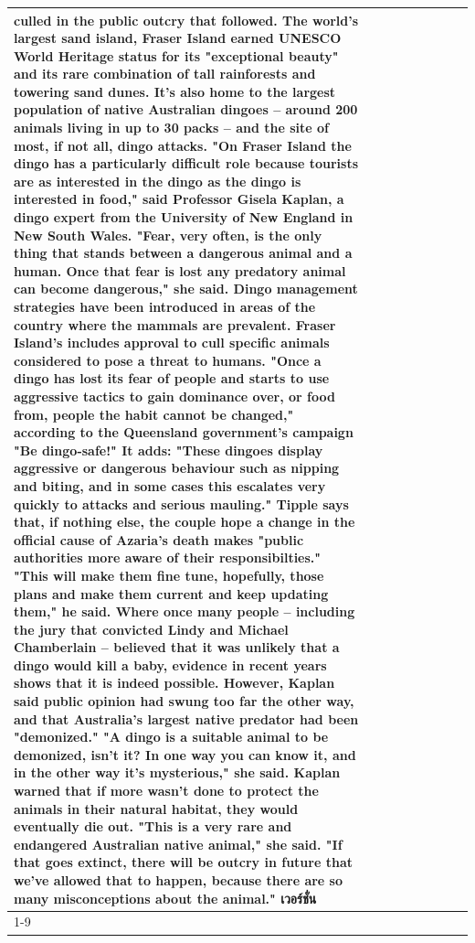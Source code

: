 \begin{table}[H]
\begin{tabular}{lllrlllll}
culled in the public outcry that followed. The world's largest sand island, Fraser Island earned UNESCO World Heritage status for its "exceptional beauty" and its rare combination of tall rainforests and towering sand dunes. It's also home to the largest population of native Australian dingoes -- around 200 animals living in up to 30 packs -- and the site of most, if not all, dingo attacks. "On Fraser Island the dingo has a particularly difficult role because tourists are as interested in the dingo as the dingo is interested in food," said Professor Gisela Kaplan, a dingo expert from the University of New England in New South Wales. "Fear, very often, is the only thing that stands between a dangerous animal and a human. Once that fear is lost any predatory animal can become dangerous," she said. Dingo management strategies have been introduced in areas of the country where the mammals are prevalent. Fraser Island's includes approval to cull specific animals considered to pose a threat to humans. "Once a dingo has lost its fear of people and starts to use aggressive tactics to gain dominance over, or food from, people the habit cannot be changed," according to the Queensland government's campaign "Be dingo-safe!" It adds: "These dingoes display aggressive or dangerous behaviour such as nipping and biting, and in some cases this escalates very quickly to attacks and serious mauling." Tipple says that, if nothing else, the couple hope a change in the official cause of Azaria's death makes "public authorities more aware of their responsibilties." "This will make them fine tune, hopefully, those plans and make them current and keep updating them," he said. Where once many people -- including the jury that convicted Lindy and Michael Chamberlain -- believed that it was unlikely that a dingo would kill a baby, evidence in recent years shows that it is indeed possible. However, Kaplan said public opinion had swung too far the other way, and that Australia's largest native predator had been "demonized." "A dingo is a suitable animal to be demonized, isn't it? In one way you can know it, and in the other way it's mysterious," she said. Kaplan warned that if more wasn't done to protect the animals in their natural habitat, they would eventually die out. "This is a very rare and endangered Australian native animal," she said. "If that goes extinct, there will be outcry in future that we've allowed that to happen, because there are so many misconceptions about the animal." เวอร์ชั่น \\
\cline{1-9}

\end{tabular}
\end{table}
